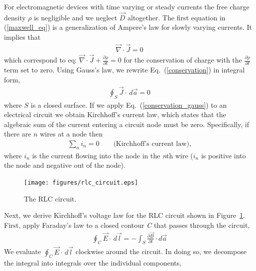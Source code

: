 \documentclass[11pt,a4paper,oneside]{book}
\numberwithin{equation}{section}
\theoremstyle{it}
\theoremstyle{definition}
\begin{document}
For electromagnetic devices with time varying or steady currents the free charge density $\rho$ is negligible and we neglect $\vec{D}$ altogether.
The first equation in (\ref{maxwell_eq}) is a generalization of Ampere's law for slowly varying currents. It implies that
\begin{equation}\label{conservation}
	\begin{aligned}
		\vec{\nabla}\cdot\vec{J} = 0	
	\end{aligned}
\end{equation} 
which correspond to eq: $\vec{\nabla}\cdot\vec{J} +\frac{\partial\rho}{\partial t} = 0$ for the conservation of charge with the $\frac{\partial\rho}{\partial t}$ term set to zero. Using Gauss's law, we rewrite Eq.~(\ref{conservation}) in integral form,
\begin{equation}\label{conservation_gauss}
	\begin{aligned}
		\oint_S \vec{J}\cdot\,d\vec{a}=0
	\end{aligned}
\end{equation} 
where $S$ is a closed surface. If we apply Eq.~(\ref{conservation_gauss}) to an electrical circuit we obtain Kirchhoff's current law, which states that the algebraic sum of the current entering a circuit node must be zero. Specifically, if there are $n$ wires at a node then
\begin{equation}\label{kcurrentlaw}
	\begin{aligned}
		\sum_{n}^{}i_n=0\qquad \text{(Kirchhoff's current law),}
	\end{aligned}
\end{equation} 
where $i_n$ is the current flowing into the node in the \textit{n}th wire ($i_n$ is positive into the node and negative out of the node).
\begin{figure}[H]
	\centering
	\texttt{[image: figures/rlc\_circuit.eps]}
	\captionsetup{width=0.75\textwidth}		
	\caption{The RLC circuit.}
	\label{rlc_circuit}
\end{figure}
Next, we derive Kirchhoff's voltage law for the RLC circuit shown in  Figure~\ref{rlc_circuit}. First, apply Faraday's law to a closed contour \textit{C} that passes through the circuit,
\begin{equation}\label{faraday}
	\begin{aligned}
		\oint_{C}\vec{E}\cdot\,d\vec{l} = - \int_{S}\frac{\partial \vec{B}}{\partial t}\cdot d\vec{a}
	\end{aligned}
\end{equation} 
We evaluate $\oint_{C}\vec{E}\cdot\,d\vec{l}$ clockwise around the circuit. In doing so, we decompose the integral into integrals over the individual components,
\end{document}
